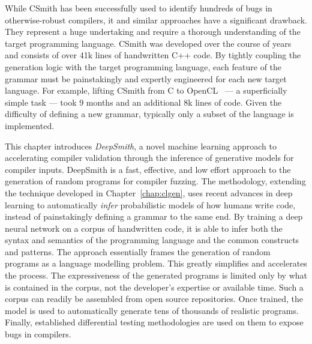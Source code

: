 While CSmith has been successfully used to identify hundreds of bugs in otherwise-robust  compilers, it and similar approaches have a significant drawback. They represent a huge undertaking and require a thorough understanding of the target programming language. CSmith was developed over the course of years and consists of over 41k lines of handwritten C++ code. By tightly coupling the generation logic with the target programming language, each feature of the grammar must be painstakingly and expertly engineered for each new target language. For example, lifting CSmith from C to OpenCL~\cite{Lidbury2015a} --- a superficially simple task --- took 9 months and an additional 8k lines of code. Given the difficulty of defining a new grammar, typically only a subset of the language is implemented.

This chapter introduces \emph{DeepSmith}, a novel machine learning approach to accelerating compiler validation through the inference of generative models for compiler inputs. DeepSmith is a fast, effective, and low effort approach to the generation of random programs for compiler fuzzing. The methodology, extending the technique developed in Chapter~\ref{chap:clgen}, uses recent advances in deep learning to automatically \emph{infer} probabilistic models of how humans write code, instead of painstakingly defining a grammar to the same end. By training a deep neural network on a corpus of handwritten code, it is able to infer both the syntax and semantics of the programming language and the common constructs and patterns. The approach essentially frames the generation of random programs as a language modelling problem. This greatly simplifies and accelerates the process. The expressiveness of the generated programs is limited only by what is contained in the corpus, not the developer's expertise or available time. Such a corpus can readily be assembled from open source repositories. Once trained, the model is used to automatically generate tens of thousands of realistic programs. Finally, established differential testing methodologies are used on them to expose bugs in compilers.

